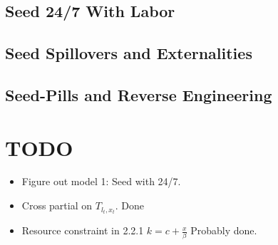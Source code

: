 \documentclass[11pt]{article}
\begin{document}
\subsection{Seed 24/7 With Labor}
\label{sub:seed_24_7_with_labor}

\subsection{Seed Spillovers and Externalities}
\label{sub:seed_spillovers_and_externalities}

\subsection{Seed-Pills and Reverse Engineering}
\label{sub:seed_pills_and_reverse_engineering}

\section{TODO}
\label{sec:todo}

  \begin{itemize}
    \item Figure out model 1: Seed with 24/7.
    \item Cross partial on $T_{l_t,x_t}$. Done
    \item Resource constraint in 2.2.1 $k = c + \frac{x}{\beta}$ Probably done.
  \end{itemize}
  


\label{bib:bibliography}
\end{document}
